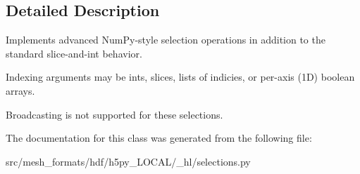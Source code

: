 \subsection{Detailed Description}
\begin{DoxyVerb}    Implements advanced NumPy-style selection operations in addition to
    the standard slice-and-int behavior.

    Indexing arguments may be ints, slices, lists of indicies, or
    per-axis (1D) boolean arrays.

    Broadcasting is not supported for these selections.
\end{DoxyVerb}
 

The documentation for this class was generated from the following file\+:\begin{DoxyCompactItemize}
\item 
src/mesh\+\_\+formats/hdf/h5py\+\_\+\+L\+O\+C\+A\+L/\+\_\+hl/selections.\+py\end{DoxyCompactItemize}
